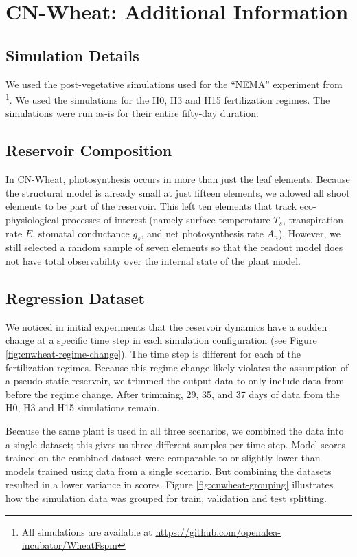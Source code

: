 \chapter{CN-Wheat: Additional Information} \label{app:cnwheat}

\section{Simulation Details} \label{app:cnwheat-simulation}

We used the post-vegetative simulations used for the ``NEMA'' experiment from \citet{barillot_cn-wheat_2016-1}\footnote{All simulations are available at \url{https://github.com/openalea-incubator/WheatFspm}}. 
We used the simulations for the H0, H3 and H15 fertilization regimes.
The simulations were run as-is for their entire fifty-day duration.


\section{Reservoir Composition} \label{app:cnwheat-reservoir}

In CN-Wheat, photosynthesis occurs in more than just the leaf elements.
Because the structural model is already small at just fifteen elements, we allowed all shoot elements to be part of the reservoir.
This left ten elements that track eco-physiological processes of interest (namely surface temperature $T_s$, transpiration rate $E$, stomatal conductance $g_s$, and net photosynthesis rate $A_n$).
However, we still selected a random sample of seven elements so that the readout model does not have total observability over the internal state of the plant model.


\section{Regression Dataset} \label{app:cnwheat-dataset}

We noticed in initial experiments that the reservoir dynamics have a sudden change at a specific time step in each simulation configuration (see Figure \ref{fig:cnwheat-regime-change}).
The time step is different for each of the fertilization regimes.
Because this regime change likely violates the assumption of a pseudo-static reservoir, we trimmed the output data to only include data from before the regime change.
After trimming, 29, 35, and 37 days of data from the H0, H3 and H15 simulations remain.

Because the same plant is used in all three scenarios, we combined the data into a single dataset; this gives us three different samples per time step.
Model scores trained on the combined dataset were comparable to or slightly lower than models trained using data from a single scenario.
But combining the datasets resulted in a lower variance in scores.
Figure \ref{fig:cnwheat-grouping} illustrates how the simulation data was grouped for train, validation and test splitting.

